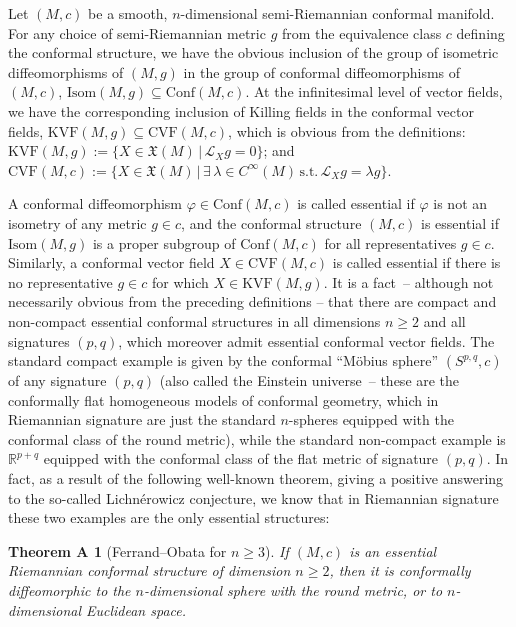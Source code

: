 \documentclass[pdftex]{sigma}
\def\R{\mathbb{R}}
\def\VF{\mathfrak{X}}
\theoremstyle{plain}
\theoremstyle{definition}
\newtheorem*{TheoremA}{Theorem A}
\begin{document}
Let $(M,c)$ be a smooth, $n$-dimensional semi-Riemannian conformal manifold. For any choice of semi-Riemannian metric $g$ from the equivalence class $c$ def\/ining the conformal structure, we have the obvious inclusion of the group of isometric dif\/feomorphisms of $(M,g)$ in the group of conformal dif\/feomorphisms of $(M,c)$, $\mathrm{Isom}(M,g) \subseteq \mathrm{Conf}(M,c)$. At the inf\/initesimal level of vector f\/ields, we have the corresponding inclusion of Killing f\/ields in the conformal vector f\/ields, $\mathrm{KVF}(M,g) \subseteq \mathrm{CVF}(M,c)$, which is obvious from the def\/initions: $\mathrm{KVF}(M,g) := \{ X \in \VF(M) \, \vert \, \mathcal{L}_X g = 0\}$; and $\mathrm{CVF}(M,c) := \{ X \in \VF(M) \, \vert \, \exists \, \lambda \in C^{\infty}(M) \, \mathrm{s.t.} \, \mathcal{L}_X g = \lambda g   \}$.

A conformal dif\/feomorphism $\varphi \in \mathrm{Conf}(M,c)$ is called essential if $\varphi$ is not an isometry of any metric $g \in c$, and the conformal structure $(M,c)$ is essential if $\mathrm{Isom}(M,g)$ is a proper subgroup of $\mathrm{Conf}(M,c)$ for all representatives $g \in c$. Similarly, a conformal vector f\/ield $X \in \mathrm{CVF}(M,c)$ is called essential if there is no representative $g \in c$ for which $X \in \mathrm{KVF}(M,g)$. It is a fact~-- although not necessarily obvious from the preceding def\/initions -- that there are compact and non-compact essential conformal structures in all dimensions $n \geq 2$ and all signatures $(p,q)$, which moreover admit essential conformal vector f\/ields. The standard compact example is given by the conformal ``M\"obius sphere'' $(S^{p,q},c)$ of any signature $(p,q)$ (also called the Einstein universe~-- these are the conformally f\/lat homogeneous models of conformal geometry, which in Riemannian signature are just the standard $n$-spheres equipped with the conformal class of the round metric), while the standard non-compact example is $\R^{p+q}$ equipped with the conformal class of the f\/lat metric of signature $(p,q)$. In fact, as a result of the following well-known theorem, giving a positive answering to the so-called Lichn\'{e}rowicz conjecture, we know that in Riemannian signature these two examples are the only essential structures:

\begin{TheoremA}[Ferrand--Obata for $n \geq 3$] \label{TheoremA}
\it If $(M,c)$ is an essential Riemannian conformal structure of dimension $n \geq 2$, then it is conformally diffeomorphic to the $n$-dimensional sphere with the round metric, or to $n$-dimensional Euclidean space.
\end{TheoremA}
\end{document}
